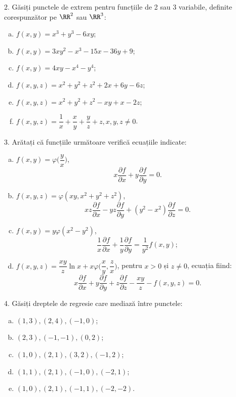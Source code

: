 \vspace{0.3cm}

2. Găsiți punctele de extrem pentru funcțiile de 2 sau 3 variabile, definite
corespunzător pe $ \RR^2 $ sau $ \RR^3 $:
\begin{enumerate}[(a)]
\item $ f(x, y) = x^3 + y^3 - 6xy $;
\item $ f(x, y) = 3xy^2 - x^3 - 15x - 36y + 9 $;
\item $ f(x, y) = 4xy - x^4 - y^4 $;
\item $ f(x, y, z) = x^2 + y^2 + z^2 + 2x + 6y - 6z $;
\item $ f(x, y, z) = x^2 + y^2 + z^2 - xy + x - 2z $;
\item $ f(x, y, z) = \dfrac{1}{x} + \dfrac{x}{y} + \dfrac{y}{z} + z, x, y, z \neq 0 $.
\end{enumerate}

\vspace{0.3cm}

3. Arătați că funcțiile următoare verifică ecuațiile indicate:
\begin{enumerate}[(a)]
\item $ f(x, y) = \varphi \Big( \dfrac{y}{x} \Big) $,
  \[
    x \frac{\partial f}{\partial x} + y \frac{\partial f}{\partial y} = 0.
  \]
\item $ f(x, y, z) = \varphi(xy, x^2 + y^2 + z^2) $,
  \[
    xz \frac{\partial f}{\partial x} - yz \frac{\partial f}{\partial y} + %
    (y^2 - x^2) \frac{\partial f}{\partial z} = 0.
  \]
\item $ f(x, y) = y \varphi(x^2 - y^2) $,
  \[
    \frac{1}{x} \frac{\partial f}{\partial x} + \frac{1}{y} \frac{\partial f}{\partial y} = %
    \frac{1}{y^2} f(x, y);
  \]
\item $ f(x, y, z) = \dfrac{xy}{z} \ln x + x\varphi \Big( \dfrac{x}{y}, \dfrac{z}{x} \Big) $,
  pentru $ x > 0 $ și $ z \neq 0 $, ecuația fiind:
  \[
    x \frac{\partial f}{\partial x} + y \frac{\partial f}{\partial y} + z \frac{\partial f}{\partial z} - %
    \frac{xy}{z} - f(x, y, z) = 0.
  \]
\end{enumerate}

\vspace{0.3cm}

4. Găsiți dreptele de regresie care mediază între punctele:
\begin{enumerate}[(a)]
\item $ (1, 3), (2, 4), (-1, 0) $;
\item $ (2, 3), (-1, -1), (0, 2) $;
\item $ (1, 0), (2, 1), (3, 2), (-1, 2) $;
\item $ (1, 1), (2, 1), (-1, 0), (-2, 1) $;
\item $ (1, 0), (2, 1), (-1, 1), (-2, -2) $.
\end{enumerate}

